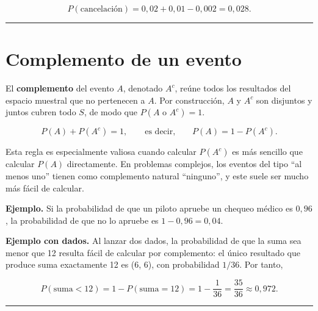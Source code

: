 \documentclass[
  spanish,
  letterpaper,
  DIV=11,
  numbers=noendperiod]{scrartcl}
\begin{document}
\[P(\text{cancelación}) = 0{,}02 + 0{,}01 - 0{,}002 = 0{,}028.\]

\begin{center}\rule{0.5\linewidth}{0.5pt}\end{center}

\section{Complemento de un evento}\label{complemento-de-un-evento}

El \textbf{complemento} del evento \(A\), denotado \(A^c\), reúne todos
los resultados del espacio muestral que no pertenecen a \(A\). Por
construcción, \(A\) y \(A^c\) son disjuntos y juntos cubren todo \(S\),
de modo que \(P(A \text{ o } A^c) = 1\).

\begin{tcolorbox}[enhanced jigsaw, arc=.35mm, bottomrule=.15mm, bottomtitle=1mm, breakable, colback=white, colbacktitle=quarto-callout-important-color!10!white, colframe=quarto-callout-important-color-frame, coltitle=black, left=2mm, leftrule=.75mm, opacityback=0, opacitybacktitle=0.6, rightrule=.15mm, title=\textcolor{quarto-callout-important-color}{\faExclamation}\hspace{0.5em}{Regla del complemento}, titlerule=0mm, toprule=.15mm, toptitle=1mm]

\[P(A) + P(A^c) = 1, \qquad \text{es decir,} \qquad P(A) = 1 - P(A^c).\]

\end{tcolorbox}

Esta regla es especialmente valiosa cuando calcular \(P(A^c)\) es más
sencillo que calcular \(P(A)\) directamente. En problemas complejos, los
eventos del tipo ``al menos uno'' tienen como complemento natural
``ninguno'', y este suele ser mucho más fácil de calcular.

\textbf{Ejemplo.} Si la probabilidad de que un piloto apruebe un chequeo
médico es \(0{,}96\), la probabilidad de que no lo apruebe es
\(1 - 0{,}96 = 0{,}04\).

\textbf{Ejemplo con dados.} Al lanzar dos dados, la probabilidad de que
la suma sea menor que 12 resulta fácil de calcular por complemento: el
único resultado que produce suma exactamente 12 es (6, 6), con
probabilidad \(1/36\). Por tanto,

\[P(\text{suma} < 12) = 1 - P(\text{suma} = 12) = 1 - \frac{1}{36} = \frac{35}{36} \approx 0{,}972.\]

\begin{center}\rule{0.5\linewidth}{0.5pt}\end{center}
\end{document}

